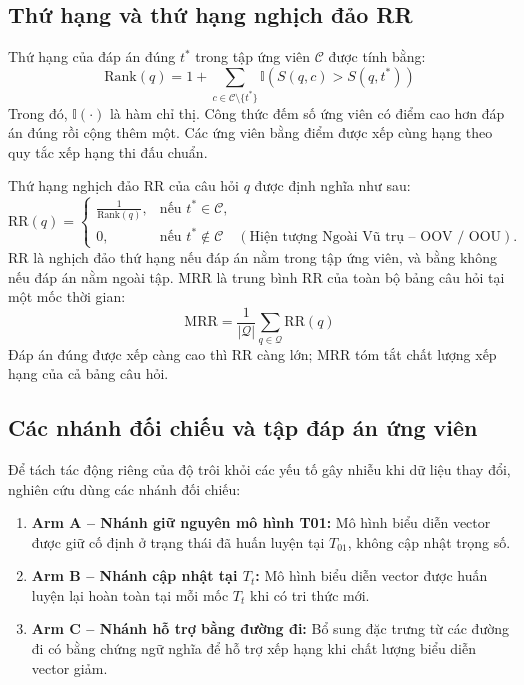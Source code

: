 \subsection{Thứ hạng và thứ hạng nghịch đảo RR}
Thứ hạng của đáp án đúng $t^*$ trong tập ứng viên $\mathcal{C}$ được tính bằng:
\begin{equation}
\text{Rank}(q) = 1 + \sum_{c \in \mathcal{C} \setminus \{t^*\}} \mathbb{I}\left( S(q, c) > S(q, t^*) \right)
\end{equation}
Trong đó, $\mathbb{I}(\cdot)$ là hàm chỉ thị. Công thức đếm số ứng viên có điểm cao hơn đáp án đúng rồi cộng thêm một. Các ứng viên bằng điểm được xếp cùng hạng theo quy tắc xếp hạng thi đấu chuẩn.

Thứ hạng nghịch đảo RR của câu hỏi $q$ được định nghĩa như sau:
\begin{equation}
\text{RR}(q) = \begin{cases}
\displaystyle \frac{1}{\text{Rank}(q)}, & \text{nếu } t^* \in \mathcal{C}, \\[8pt]
0, & \text{nếu } t^* \notin \mathcal{C} \quad (\text{Hiện tượng Ngoài Vũ trụ -- OOV / OOU}).
\end{cases}
\label{eq:reciprocal_rank}
\end{equation}
RR là nghịch đảo thứ hạng nếu đáp án nằm trong tập ứng viên, và bằng không nếu đáp án nằm ngoài tập. MRR là trung bình RR của toàn bộ bảng câu hỏi tại một mốc thời gian:
\begin{equation}
\text{MRR} = \frac{1}{|\mathcal{Q}|} \sum_{q \in \mathcal{Q}} \text{RR}(q)
\end{equation}
Đáp án đúng được xếp càng cao thì RR càng lớn; MRR tóm tắt chất lượng xếp hạng của cả bảng câu hỏi.
\subsection{Các nhánh đối chiếu và tập đáp án ứng viên}
Để tách tác động riêng của độ trôi khỏi các yếu tố gây nhiễu khi dữ liệu thay đổi, nghiên cứu dùng các nhánh đối chiếu:

\begin{enumerate}
    \item \textbf{Arm A -- Nhánh giữ nguyên mô hình T01:} Mô hình biểu diễn vector được giữ cố định ở trạng thái đã huấn luyện tại $T_{01}$, không cập nhật trọng số.
    \item \textbf{Arm B -- Nhánh cập nhật tại $T_t$:} Mô hình biểu diễn vector được huấn luyện lại hoàn toàn tại mỗi mốc $T_t$ khi có tri thức mới.
    \item \textbf{Arm C -- Nhánh hỗ trợ bằng đường đi:} Bổ sung đặc trưng từ các đường đi có bằng chứng ngữ nghĩa để hỗ trợ xếp hạng khi chất lượng biểu diễn vector giảm.
\end{enumerate}

